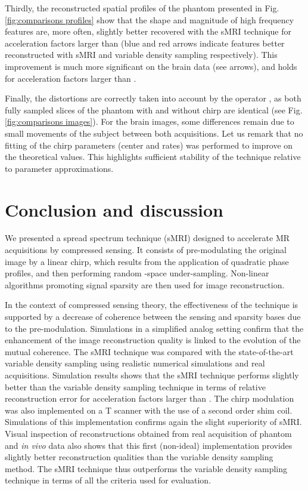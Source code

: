 \documentclass[10pt,draftcls, onecolumn]{IEEEtran}
\begin{document}
Thirdly, the reconstructed spatial profiles of the phantom presented in Fig. \ref{fig:comparisons profiles} show that the shape and magnitude of high frequency features are, more often, slightly better recovered with the sMRI technique for acceleration factors larger than  (blue and red arrows indicate features better reconstructed with sMRI and variable density sampling respectively). This improvement is much more significant on the brain data (see arrows), and holds for acceleration factors larger than .

Finally, the distortions are correctly taken into account by the operator , as both fully sampled slices of the phantom with and without chirp are identical (see Fig. \ref{fig:comparisons images}). For the brain images, some differences remain due to small movements of the subject between both acquisitions. Let us remark that no fitting of the chirp parameters (center and rates) was performed to improve on the theoretical values. This highlights sufficient stability of the technique relative to parameter approximations.

\section{Conclusion and discussion}
\label{sec:Conclusion}

We presented a spread spectrum technique (sMRI) designed to accelerate MR acquisitions by compressed sensing. It consists of pre-modulating the original image by a linear chirp, which results from the application of quadratic phase profiles, and then performing random -space under-sampling. Non-linear algorithms promoting signal sparsity are then used for image reconstruction.

In the context of compressed sensing theory, the effectiveness of the technique is supported by a decrease of coherence between the sensing and sparsity bases due to the pre-modulation. Simulations in a simplified analog setting confirm that the enhancement of the image reconstruction quality is linked to the evolution of the mutual coherence. The sMRI technique was compared with the state-of-the-art variable density sampling using realistic numerical simulations and real acquisitions. Simulation results shows that the sMRI technique performs slightly better than the variable density sampling technique in terms of relative reconstruction error for acceleration factors larger than . The chirp modulation was also implemented on a T scanner with the use of a second order shim coil. Simulations of this implementation confirms again the slight superiority of sMRI. Visual inspection of reconstructions obtained from real acquisition of phantom and \emph{in vivo} data also shows that this first (non-ideal) implementation provides slightly better reconstruction qualities than the variable density sampling method. The sMRI technique thus outperforms the variable density sampling technique in terms of all the criteria used for evaluation.
\end{document}
